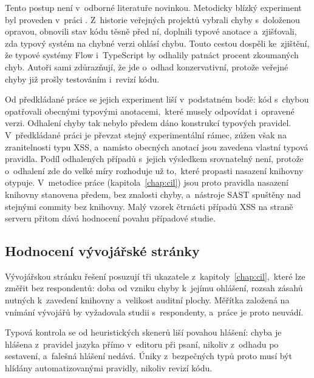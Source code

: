 Tento postup není v~odborné literatuře novinkou. Metodicky blízký experiment byl proveden v~práci \textcite{gao2017types}. Z~historie veřejných projektů vybrali chyby s~doloženou opravou, obnovili stav kódu těsně před ní, doplnili typové anotace a~zjišťovali, zda typový systém na chybné verzi ohlásí chybu. Touto cestou dospěli ke~zjištění, že typové systémy Flow i~TypeScript by odhalily patnáct procent zkoumaných chyb. Autoři sami zdůrazňují, že jde o~odhad konzervativní, protože veřejné chyby již prošly testováním i~revizí kódu.

Od předkládané práce se jejich experiment liší v~podstatném bodě: kód s~chybou opatřovali obecnými typovými anotacemi,~které musely odpovídat i~opravené verzi. Odhalení chyby tak nebylo předem dáno konstrukcí typových pravidel. V~předkládané práci je převzat stejný experimentální rámec, zúžen však na zranitelnosti typu XSS, a~namísto obecných anotací jsou zavedena vlastní typová pravidla. Podíl odhalených případů s~jejich výsledkem srovnatelný není, protože o~odhalení zde do velké míry rozhoduje už to,~které propasti nasazení knihovny otypuje. V~metodice práce (kapitola~\ref{chap:cil}) jsou proto pravidla nasazení knihovny stanovena předem, bez znalosti chyby, a~nástroje SAST spuštěny nad stejnými commity bez knihovny. Malý vzorek čtrnácti případů XSS na straně serveru přitom dává hodnocení povahu případové studie.

\subsection{Hodnocení vývojářské stránky}
\label{sec:space}

Vývojářskou stránku řešení posuzují tři ukazatele z~kapitoly~\ref{chap:cil},~které lze změřit bez respondentů: doba od vzniku chyby k~jejímu ohlášení, rozsah zásahů nutných k~zavedení knihovny a~velikost auditní plochy. Měřítka založená na vnímání vývojářů by vyžadovala studii s~respondenty, a~práce je proto neuvádí.

\label{sec:heuristika}
Typová kontrola se od heuristických skenerů liší povahou hlášení: chyba je hlášena z~pravidel jazyka přímo v~editoru při psaní, nikoliv z~odhadu po sestavení, a~falešná hlášení nedává. Úniky z~bezpečných typů proto musí být hlídány automatizovanými pravidly, nikoliv revizí kódu.
